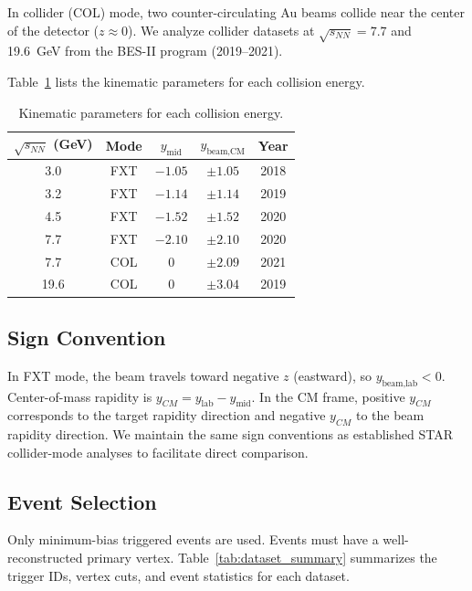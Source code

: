 \documentclass[aps,prc,preprint,superscriptaddress,nofootinbib]{revtex4-2}
\begin{document}
In collider (COL) mode, two counter-circulating Au beams collide near the center of the detector ($z \approx 0$). We analyze collider datasets at $\sqrt{s_{NN}} = 7.7$ and 19.6~GeV from the BES-II program (2019--2021).

Table~\ref{tab:rapidity_params} lists the kinematic parameters for each collision energy.

\begin{table}[h]
\centering
\caption{Kinematic parameters for each collision energy.}
\label{tab:rapidity_params}
\begin{tabular}{ccccc}
\toprule
$\sqrt{s_{NN}}$ (GeV) & Mode & $y_{\text{mid}}$ & $y_{\text{beam,CM}}$ & Year \\
\midrule
3.0  & FXT & $-1.05$  & $\pm 1.05$  & 2018 \\
3.2  & FXT & $-1.14$  & $\pm 1.14$  & 2019 \\
4.5  & FXT & $-1.52$  & $\pm 1.52$  & 2020 \\
7.7  & FXT & $-2.10$  & $\pm 2.10$  & 2020 \\
7.7  & COL & 0        & $\pm 2.09$  & 2021 \\
19.6 & COL & 0        & $\pm 3.04$  & 2019 \\
\bottomrule
\end{tabular}
\end{table}

\subsection{Sign Convention}
\label{subsec:sign_convention}

In FXT mode, the beam travels toward negative $z$ (eastward), so $y_{\text{beam,lab}} < 0$. Center-of-mass rapidity is $y_{CM} = y_{\text{lab}} - y_{\text{mid}}$. In the CM frame, positive $y_{CM}$ corresponds to the target rapidity direction and negative $y_{CM}$ to the beam rapidity direction. We maintain the same sign conventions as established STAR collider-mode analyses to facilitate direct comparison.

\subsection{Event Selection}
\label{subsec:event_selection}

Only minimum-bias triggered events are used. Events must have a well-reconstructed primary vertex. Table~\ref{tab:dataset_summary} summarizes the trigger IDs, vertex cuts, and event statistics for each dataset.
\end{document}
